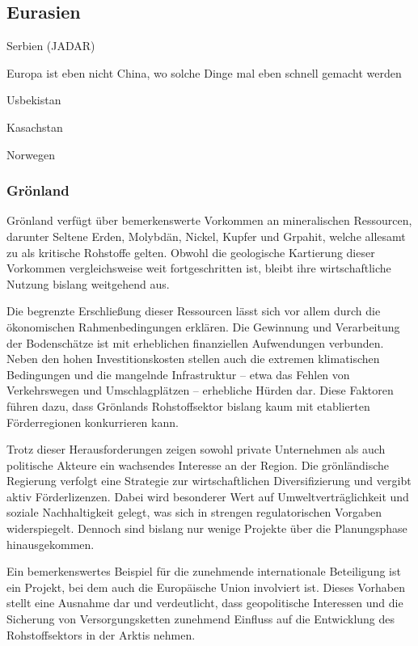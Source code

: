 \documentclass[12pt,a4paper,oneside]{book} %
\begin{document}
{\subsection{Eurasien}

Serbien (JADAR)

\glqq Europa ist eben nicht China, wo solche Dinge mal eben schnell gemacht werden\grqq \autocite{Der Stoff, aus dem die Waffen sind; SZ 28.08.2026, Seite 3}

Usbekistan

Kasachstan

Norwegen

\subsubsection{Grönland}

Grönland verfügt über bemerkenswerte Vorkommen an mineralischen Ressourcen, darunter Seltene Erden, Molybdän, Nickel, Kupfer und Grpahit, welche allesamt zu als kritische Rohstoffe gelten. Obwohl die geologische Kartierung dieser Vorkommen vergleichsweise weit fortgeschritten ist, bleibt ihre wirtschaftliche Nutzung bislang weitgehend aus.

Die begrenzte Erschließung dieser Ressourcen lässt sich vor allem durch die ökonomischen Rahmenbedingungen erklären. Die Gewinnung und Verarbeitung der Bodenschätze ist mit erheblichen finanziellen Aufwendungen verbunden. Neben den hohen Investitionskosten stellen auch die extremen klimatischen Bedingungen und die mangelnde Infrastruktur – etwa das Fehlen von Verkehrswegen und Umschlagplätzen – erhebliche Hürden dar. Diese Faktoren führen dazu, dass Grönlands Rohstoffsektor bislang kaum mit etablierten Förderregionen konkurrieren kann.

Trotz dieser Herausforderungen zeigen sowohl private Unternehmen als auch politische Akteure ein wachsendes Interesse an der Region. Die grönländische Regierung verfolgt eine Strategie zur wirtschaftlichen Diversifizierung und vergibt aktiv Förderlizenzen. Dabei wird besonderer Wert auf Umweltverträglichkeit und soziale Nachhaltigkeit gelegt, was sich in strengen regulatorischen Vorgaben widerspiegelt. Dennoch sind bislang nur wenige Projekte über die Planungsphase hinausgekommen.

Ein bemerkenswertes Beispiel für die zunehmende internationale Beteiligung ist ein Projekt, bei dem auch die Europäische Union involviert ist. Dieses Vorhaben stellt eine Ausnahme dar und verdeutlicht, dass geopolitische Interessen und die Sicherung von Versorgungsketten zunehmend Einfluss auf die Entwicklung des Rohstoffsektors in der Arktis nehmen.

}
\end{document}
